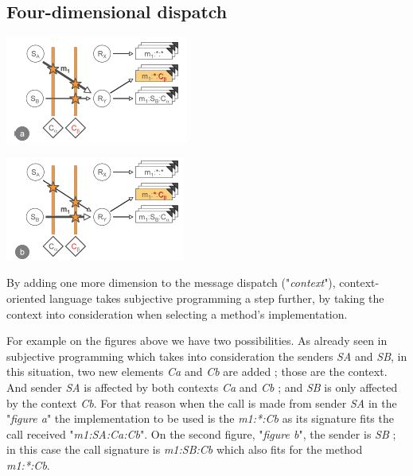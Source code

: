\documentclass[journal,10pt,compsoc]{IEEEtran}
\begin{document}
\subsection{Four-dimensional dispatch}
\label{sec:org4065866}
\begin{center}
\includegraphics[width=.9\linewidth]{./four1.png}
\end{center}
\begin{center}
\includegraphics[width=.9\linewidth]{./four2.png}
\end{center}
   By adding one more dimension to the message dispatch ("\emph{context}"), context-oriented language takes subjective programming a step further, by taking the context into consideration 
when selecting a method's implementation.

For example on the figures above we have two possibilities. As already seen in subjective programming which takes into consideration the senders \emph{SA} and \emph{SB}, in this situation,
two new elements \emph{Ca} and \emph{Cb} are added ; those are the context. And sender \emph{SA} is affected by both contexts  \emph{Ca} and \emph{Cb} ; and \emph{SB} is only affected by the context \emph{Cb}. For that reason 
when the call is made from sender \emph{SA} in the "\emph{figure a}" the implementation to be used is the \emph{m1:*:Cb} as its signature fits the call received "\emph{m1:SA:Ca:Cb}". 
On the second figure, "\emph{figure b}", the sender is \emph{SB} ; in this case the call signature is \emph{m1:SB:Cb} which also fits for the method  \emph{m1:*:Cb}.
\end{document}
